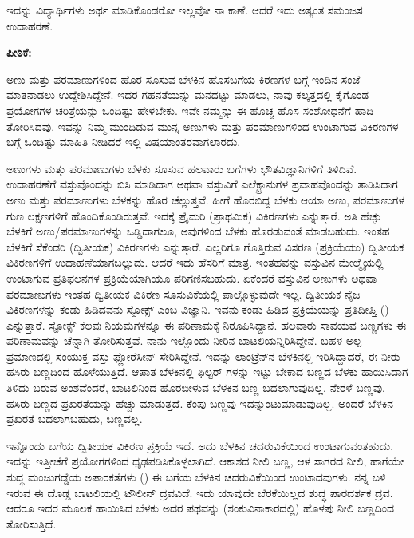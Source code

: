 ಇದನ್ನು ವಿದ್ಯಾರ್ಥಿಗಳು ಅರ್ಥ ಮಾಡಿಕೊಂಡರೋ ಇಲ್ಲವೋ ನಾ ಕಾಣೆ. ಆದರೆ ಇದು ಅತ್ಯಂತ ಸಮಂಜಸ ಉದಾಹರಣೆ.



\noindent
\textbf{ಪೀಠಿಕೆ:}

ಅಣು ಮತ್ತು ಪರಮಾಣುಗಳಿಂದ ಹೊರ ಸೂಸುವ ಬೆಳಕಿನ ಹೊಸಬಗೆಯ ಕಿರಣಗಳ ಬಗ್ಗೆ ಇಂದಿನ ಸಂಜೆ ಮಾತನಾಡಲು ಉದ್ದೇಶಿಸಿದ್ದೇನೆ. ಇದರ ಗಹನತೆಯನ್ನು ಮನದಟ್ಟು ಮಾಡಲು, ನಾವು ಕಲ್ಕತ್ತದಲ್ಲಿ ಕೈಗೊಂಡ ಪ್ರಯೋಗಗಳ ಚರಿತ್ರೆಯನ್ನು ಒಂದಿಷ್ಟು ಹೇಳಬೇಕು. ಇವೇ ನಮ್ಮನ್ನು ಈ ಹೊಚ್ಚ ಹೊಸ ಸಂಶೋಧನೆಗೆ ಹಾದಿ ತೋರಿಸಿದವು. ಇವನ್ನು ನಿಮ್ಮ ಮುಂದಿಡುವ ಮುನ್ನ ಅಣುಗಳು ಮತ್ತು ಪರಮಾಣುಗಳಿಂದ ಉಂಟಾಗುವ ವಿಕಿರಣಗಳ ಬಗ್ಗೆ ಒಂದಿಷ್ಟು ಮಾಹಿತಿ ನೀಡಿದರೆ ಇಲ್ಲಿ ವಿಷಯಾಂತರವಾಗಲಾರದು.

ಅಣುಗಳು ಮತ್ತು ಪರಮಾಣುಗಳು ಬೆಳಕು ಸೂಸುವ ಹಲವಾರು ಬಗೆಗಳು ಭೌತವಿಜ್ಞಾನಿಗಳಿಗೆ ತಿಳಿದಿವೆ. ಉದಾಹರಣೆಗೆ ವಸ್ತುವೊಂದನ್ನು ಬಿಸಿ ಮಾಡಿದಾಗ ಅಥವಾ ವಸ್ತುವಿಗೆ ಎಲೆಕ್ಟ್ರಾನುಗಳ ಪ್ರವಾಹವೊಂದನ್ನು ತಾಡಿಸಿದಾಗ ಅಣು ಮತ್ತು ಪರಮಾಣುಗಳು ಬೆಳಕನ್ನು ಹೊರ ಚೆಲ್ಲುತ್ತವೆ. ಹೀಗೆ ಹೊರಬಿದ್ದ ಬೆಳಕು ಆಯಾ ಅಣು, ಪರಮಾಣುಗಳ ಗುಣ ಲಕ್ಷಣಗಳಿಗೆ ಹೊಂದಿಕೊಂಡಿರುತ್ತವೆ. ಇದಕ್ಕೆ ಪ್ರೈಮರಿ (ಪ್ರಾಥಮಿಕ) ವಿಕಿರಣಗಳು ಎನ್ನುತ್ತಾರೆ. ಅತಿ ಹೆಚ್ಚು ಬೆಳಕಿಗೆ ಅಣು/ಪರಮಾಣುಗಳನ್ನು ಒಡ್ಡಿದಾಗಲೂ, ಅವುಗಳಿಂದ ಬೆಳಕು ಹೊರಡುವಂತೆ ಮಾಡಬಹುದು. ಇಂತಹ ಬೆಳಕಿಗೆ ಸೆಕೆಂಡರಿ (ದ್ವಿತೀಯಕ) ವಿಕಿರಣಗಳು ಎನ್ನುತ್ತಾರೆ. ಎಲ್ಲರಿಗೂ ಗೊತ್ತಿರುವ ವಿಸರಣ (ಪ್ರಕ್ರಿಯೆಯು) ದ್ವಿತೀಯಕ ವಿಕಿರಣಗಳಿಗೆ ಉದಾಹಣೆಯಾಗಬಲ್ಲುದು. ಆದರೆ ಇದು ಹೆಸರಿಗೆ ಮಾತ್ರ. ಇಂತಹವನ್ನು ವಸ್ತುವಿನ ಮೇಲ್ಮೈಯಲ್ಲಿ ಉಂಟಾಗುವ ಪ್ರತಿಫಲನಗಳ ಪ್ರಕ್ರಿಯೆಯಾಗಿಯೂ ಪರಿಗಣಿಸಬಹುದು. ಏಕೆಂದರೆ ವಸ್ತುವಿನ ಅಣುಗಳು ಅಥವಾ ಪರಮಾಣುಗಳು ಇಂತಹ ದ್ವಿತೀಯಕ ವಿಕಿರಣ ಸೂಸುವಿಕೆಯಲ್ಲಿ ಪಾಲ್ಗೊಳ್ಳುವುದೇ ಇಲ್ಲ. ದ್ವಿತೀಯಕ ನೈಜ ವಿಕಿರಣಗಳನ್ನು ಕಂಡು ಹಿಡಿದವನು ಸ್ಟೋಕ್ಸ್ ಎಂಬ ವಿಜ್ಞಾನಿ. ಇವನು ಕಂಡು ಹಿಡಿದ ಪ್ರಕ್ರಿಯೆಯನ್ನು ಪ್ರತಿದೀಪ್ತಿ () ಎನ್ನುತ್ತಾರೆ. ಸ್ಟೋಕ್ಸ್ ಕೆಲವು ನಿಯಮಗಳನ್ನೂ ಈ ಪರಿಣಾಮಕ್ಕೆ ನಿರೂಪಿಸಿದ್ದಾನೆ. ಹಲವಾರು ಸಾವಯವ ಬಣ್ಣಗಳು ಈ ಪರಿಣಾಮವನ್ನು ಚೆನ್ನಾಗಿ ತೋರಿಸುತ್ತವೆ. ನಾನು ಇಲ್ಲೊಂದು ನೀರಿನ ಬಾಟಲಿಯನ್ನಿರಿಸಿದ್ದೇನೆ. ಬಹಳ ಅಲ್ಪ ಪ್ರಮಾಣದಲ್ಲಿ ಸಂಯುಕ್ತ ವಸ್ತು ಫ್ಲೋರೆಸೀನ್ ಸೇರಿಸಿದ್ದೇನೆ. ಇದನ್ನು ಲಾಂಟ್ರೆನ್‍ನ ಬೆಳಕಿನಲ್ಲಿ ಇರಿಸಿದ್ದಾದರೆ, ಈ ನೀರು ಹಸಿರು ಬಣ್ಣದಿಂದ ಹೊಳೆಯುತ್ತಿದೆ. ಆಪಾತ ಬೆಳಕಿನಲ್ಲಿ ಫಿಲ್ಟರ್ ಗಳನ್ನು ಇಟ್ಟು ಬೇಕಾದ ಬಣ್ಣದ ಬೆಳಕು ಹಾಯಿಸಿದಾಗ ತಿಳಿದು ಬರುವ ಅಂಶವೆಂದರೆ, ಬಾಟಲಿನಿಂದ ಹೊರಬೀಳುವ ಬೆಳಕಿನ ಬಣ್ಣ ಬದಲಾಗುವುದಿಲ್ಲ. ನೇರಳೆ ಬಣ್ಣವು, ಹಸಿರು ಬಣ್ಣದ ಪ್ರಖರತೆಯನ್ನು ಹೆಚ್ಚು ಮಾಡುತ್ತದೆ. ಕೆಂಪು ಬಣ್ಣವು ಇದನ್ನುಂಟುಮಾಡುವುದಿಲ್ಲ. ಅಂದರೆ ಬೆಳಕಿನ ಪ್ರಖರತೆ ಬದಲಾಗಬಹುದು, ಬಣ್ಣವಲ್ಲ.

ಇನ್ನೊಂದು ಬಗೆಯ ದ್ವಿತೀಯಕ ವಿಕಿರಣ ಪ್ರಕ್ರಿಯೆ ಇದೆ. ಅದು ಬೆಳಕಿನ ಚದರುವಿಕೆಯಿಂದ ಉಂಟಾಗುವಂತಹುದು. ಇದನ್ನು ಇತ್ತೀಚೆಗೆ ಪ್ರಯೋಗಗಳಿಂದ ಧೃಢಪಡಿಸಿಕೊಳ್ಳಲಾಗಿದೆ. ಆಕಾಶದ ನೀಲಿ ಬಣ್ಣ, ಆಳ ಸಾಗರದ ನೀಲಿ, ಹಾಗೆಯೇ ಶುದ್ಧ ಮಂಜುಗಡ್ಡೆಯ ಅಪಾರಕತೆಗಳು () ಈ ಬಗೆಯ ಬೆಳಕಿನ ಚದರುವಿಕೆಯಿಂದ ಉಂಟಾದವುಗಳು. ನನ್ನ ಬಳಿ ಇರುವ ಈ ದೊಡ್ಡ ಬಾಟಲಿಯಲ್ಲಿ ಟೌಲೀನ್ ದ್ರವವಿದೆ. ಇದು ಯಾವುದೇ ಬೆರಕೆಯಿಲ್ಲದ ಶುದ್ಧ ಪಾರದರ್ಶಕ ದ್ರವ. ಆದರೂ ಇದರ ಮೂಲಕ ಹಾಯಿಸಿದ ಬೆಳಕು ಅದರ ಪಥವನ್ನು (ಶಂಕುವಿನಾಕಾರದಲ್ಲಿ) ಹೊಳಪು ನೀಲಿ ಬಣ್ಣದಿಂದ ತೋರಿಸುತ್ತಿದೆ.

